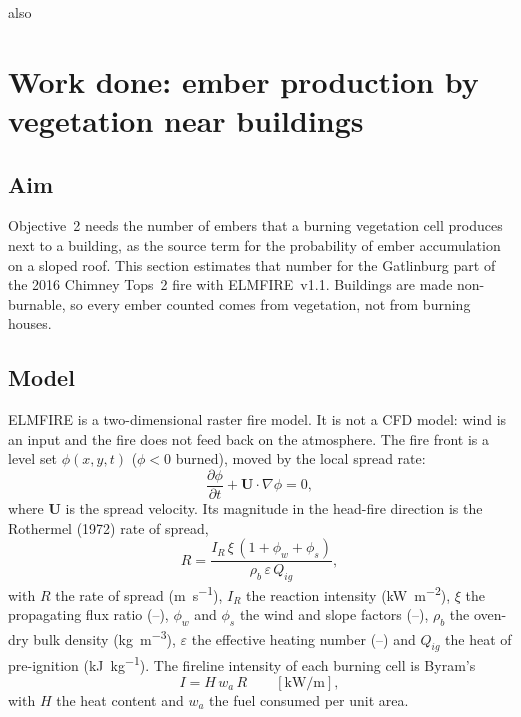 also%

\section{Work done: ember production by vegetation near buildings}
\label{sec:ember_production}

\subsection{Aim}
Objective~2 needs the number of embers that a burning vegetation cell produces next to a building,
as the source term for the probability of ember accumulation on a sloped roof. This section estimates
that number for the Gatlinburg part of the 2016 Chimney Tops~2 fire with ELMFIRE~v1.1. Buildings are
made non-burnable, so every ember counted comes from vegetation, not from burning houses.

\subsection{Model}
ELMFIRE is a two-dimensional raster fire model. It is not a CFD model: wind is an input and the fire
does not feed back on the atmosphere. The fire front is a level set $\phi(x,y,t)$ ($\phi<0$ burned),
moved by the local spread rate:
\begin{equation}
  \frac{\partial \phi}{\partial t} + \mathbf{U}\cdot\nabla\phi = 0 ,
  \label{eq:levelset}
\end{equation}
where $\mathbf{U}$ is the spread velocity. Its magnitude in the head-fire direction is the Rothermel
(1972) rate of spread,
\begin{equation}
  R = \frac{I_R\,\xi\,(1+\phi_w+\phi_s)}{\rho_b\,\varepsilon\,Q_{ig}} ,
  \label{eq:rothermel}
\end{equation}
with $R$ the rate of spread (\si{\metre\per\second}), $I_R$ the reaction intensity
(\si{\kilo\watt\per\square\metre}), $\xi$ the propagating flux ratio (--), $\phi_w$ and $\phi_s$ the
wind and slope factors (--), $\rho_b$ the oven-dry bulk density (\si{\kilo\gram\per\cubic\metre}),
$\varepsilon$ the effective heating number (--) and $Q_{ig}$ the heat of pre-ignition
(\si{\kilo\joule\per\kilo\gram}). The fireline intensity of each burning cell is Byram's
\begin{equation}
  I = H\,w_a\,R \qquad [\si{\kilo\watt\per\metre}],
  \label{eq:byram}
\end{equation}
with $H$ the heat content and $w_a$ the fuel consumed per unit area.

